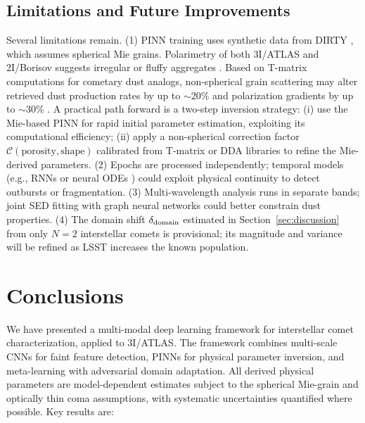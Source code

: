 \documentclass[preprint2]{aastex631}
\begin{document}
\subsection{Limitations and Future Improvements}

Several limitations remain. (1) PINN training uses synthetic data from DIRTY \citep{gordon01}, which assumes spherical Mie grains. Polarimetry of both 3I/ATLAS and 2I/Borisov suggests irregular or fluffy aggregates \citep{kolokolova04}. Based on T-matrix computations for cometary dust analogs, non-spherical grain scattering may alter retrieved dust production rates by up to $\sim$20\% and polarization gradients by up to $\sim$30\% \citep{kolokolova04,shen11}. A practical path forward is a two-step inversion strategy: (i) use the Mie-based PINN for rapid initial parameter estimation, exploiting its computational efficiency; (ii) apply a non-spherical correction factor $\mathcal{C}(\text{porosity}, \text{shape})$ calibrated from T-matrix or DDA libraries to refine the Mie-derived parameters. (2) Epochs are processed independently; temporal models (e.g., RNNs or neural ODEs \citep{chen18}) could exploit physical continuity to detect outbursts or fragmentation. (3) Multi-wavelength analysis runs in separate bands; joint SED fitting with graph neural networks could better constrain dust properties. (4) The domain shift $\delta_{\rm domain}$ estimated in Section~\ref{sec:discussion} from only $N=2$ interstellar comets is provisional; its magnitude and variance will be refined as LSST increases the known population.

\section{Conclusions}\label{sec:conclusions}

We have presented a multi-modal deep learning framework for interstellar comet characterization, applied to 3I/ATLAS. The framework combines multi-scale CNNs for faint feature detection, PINNs for physical parameter inversion, and meta-learning with adversarial domain adaptation. All derived physical parameters are model-dependent estimates subject to the spherical Mie-grain and optically thin coma assumptions, with systematic uncertainties quantified where possible. Key results are:
\end{document}
